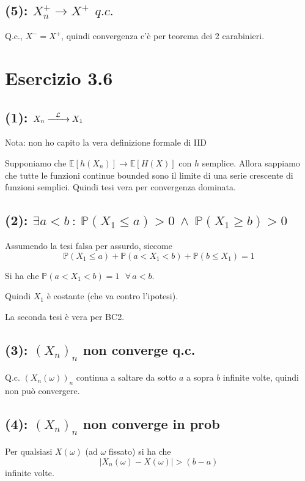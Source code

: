 \documentclass{article}
\newcommand{\myrightarrow}[1]{\xrightarrow{\makebox[2em][c]{$\scriptstyle#1$}}}
\newcommand{\convlegge}{\myrightarrow{\mathcal{L}}}
\begin{document}
\subsection{(5): $X_n^+ \rightarrow  X^+ \ \ q.c.$}
Q.c., $X^- = X^+$, quindi convergenza c'è per teorema dei 2 carabinieri.


\section{Esercizio 3.6}
\subsection{(1): $X_n \convlegge X_1$}
Nota: non ho capito la vera definizione formale di IID

Supponiamo che $\mathbb{E}\left[h(X_n)\right] \longrightarrow \mathbb{E}\left[H(X)\right]$ con $h$ semplice. Allora sappiamo che tutte le funzioni continue bounded sono il limite di una serie crescente di funzioni semplici. Quindi tesi vera per convergenza dominata.


\subsection{(2): $\exists  a<b \ : \ \mathbb{P}\left(X_1\leq a\right) > 0 \ \land  \ \mathbb{P}\left(X_1\geq b\right) > 0$}
Assumendo la tesi falsa per assurdo, siccome
\[
	\mathbb{P}\left(X_1\leq a\right) + \mathbb{P}\left(a < X_1 < b\right) + \mathbb{P}\left(b\leq X_1\right) = 1
\]

Si ha che $\mathbb{P}\left(a < X_1 < b\right) = 1\ \ \ \forall\, a<b$.

Quindi $X_1$ è costante (che va contro l'ipotesi).

La seconda tesi è vera per BC2.

\subsection{(3): $\left(X_n\right)_n$ non converge q.c.}
Q.c. $\left(X_n (\omega )\right)_n$ continua a saltare da sotto $a$ a sopra $b$ infinite volte, quindi non può convergere.

\subsection{(4): $\left(X_n\right)_n$ non converge in prob}
Per qualsiasi $X(\omega )$ (ad $\omega $ fissato) si ha che 
\[
	\left|X_n(\omega ) - X\left(\omega \right)\right| > \left(b-a\right)
\]
infinite volte.
\end{document}
